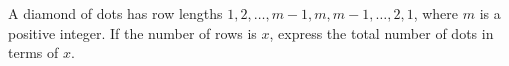 A diamond of dots has row lengths $1,2,\ldots,m-1,m,m-1,\ldots,2,1$, where $m$ is a positive integer. If the number of rows is $x$, express the total number of dots in terms of $x$.
